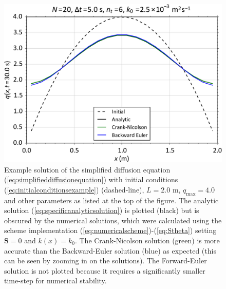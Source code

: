 \documentclass[12pt]{article}
\begin{document}
\begin{figure}[b]
\centering
\includegraphics[width=0.7\linewidth]{example_plot.pdf}
\caption{Example solution of the simplified diffusion equation (\ref{eq:simplifieddiffusionequation}) with initial conditions (\ref{eq:initialconditionsexample}) (dashed-line), $L=2.0$ m, $q_\mathrm{max}=4.0$ and other parameters as listed at the top of the figure. The analytic solution (\ref{eq:specificanalyticsolution}) is plotted (black) but is obscured by the numerical solutions, which were calculated using the scheme implementation (\ref{eq:numericalscheme})-(\ref{eq:Stheta}) setting $\mathbf{S}=0$ and $k(x)=k_0$. The Crank-Nicolson solution (green) is more accurate than the Backward-Euler solution (blue) as expected (this can be seen by zooming in on the solutions). The Forward-Euler solution is not plotted because it requires a significantly smaller time-step for numerical stability.}
\label{fig:example}
\end{figure} 
\end{document}
